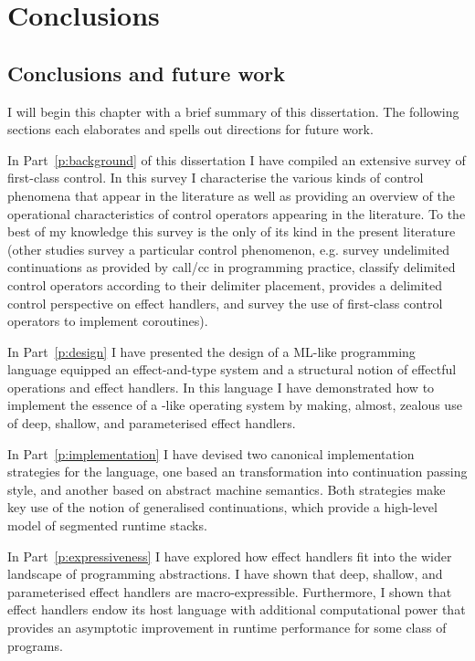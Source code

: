 \documentclass[12pt,phd,lfcs,twoside,openright,logo,leftchapter,normalheadings]{infthesis}
\theoremstyle{plain}
\theoremstyle{definition}
\begin{document}
\part{Conclusions}
\label{p:conclusions}

\chapter{Conclusions and future work}
\label{ch:conclusions}
%
I will begin this chapter with a brief summary of this
dissertation. The following sections each elaborates and spells out
directions for future work.

In Part~\ref{p:background} of this dissertation I have compiled an
extensive survey of first-class control. In this survey I characterise
the various kinds of control phenomena that appear in the literature
as well as providing an overview of the operational characteristics of
control operators appearing in the literature. To the best of my
knowledge this survey is the only of its kind in the present
literature (other studies survey a particular control phenomenon,
e.g. \citet{FelleisenS99} survey undelimited continuations as provided
by call/cc in programming practice, \citet{DybvigJS07} classify
delimited control operators according to their delimiter placement,
\citet{Brachthauser20} provides a delimited control perspective on
effect handlers, and \citet{MouraI09} survey the use of first-class
control operators to implement coroutines).

In Part~\ref{p:design} I have presented the design of a ML-like
programming language equipped an effect-and-type system and a
structural notion of effectful operations and effect handlers. In this
language I have demonstrated how to implement the essence of a
\UNIX{}-like operating system by making, almost, zealous use of deep,
shallow, and parameterised effect handlers.

In Part~\ref{p:implementation} I have devised two canonical
implementation strategies for the language, one based an
transformation into continuation passing style, and another based on
abstract machine semantics. Both strategies make key use of the notion
of generalised continuations, which provide a high-level model of
segmented runtime stacks.

In Part~\ref{p:expressiveness} I have explored how effect handlers fit
into the wider landscape of programming abstractions. I have shown
that deep, shallow, and parameterised effect handlers are
macro-expressible. Furthermore, I shown that effect handlers endow its
host language with additional computational power that provides an
asymptotic improvement in runtime performance for some class of
programs.
\end{document}
